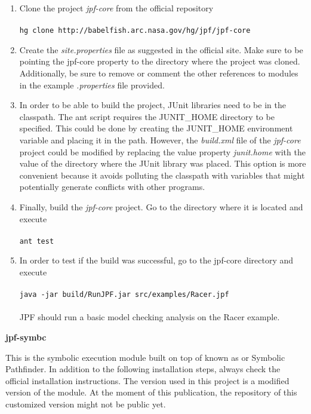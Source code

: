 \begin{enumerate}
	\item Clone the project \textit{jpf-core} from the official repository \\ \\
		\lstinline[]|hg clone http://babelfish.arc.nasa.gov/hg/jpf/jpf-core|
	\item Create the \textit{site.properties} file as suggested in the official \jpf{} site. Make sure to be pointing the jpf-core property to the directory where the project was cloned. Additionally, be sure to remove or comment the other references to modules in the example \textit{.properties} file provided.
	\item In order to be able to build the project, JUnit libraries need to be in the classpath. The ant script requires the JUNIT\_HOME directory to be specified. This could be done by creating the JUNIT\_HOME environment variable and placing it in the path. However, the \textit{build.xml} file of the \textit{jpf-core}  project could be modified by replacing the value property \textit{junit.home} with the value of the directory where the JUnit library was placed. This option is more convenient because it avoids polluting the classpath with variables that might potentially generate conflicts with other programs.
	\item Finally, build the \textit{jpf-core} project. Go to the directory where it is located and execute \\ \\
		\lstinline[]|ant test|
	\item In order to test if the build was successful, go to the jpf-core directory and execute \\ \\
		\lstinline[]|java -jar build/RunJPF.jar src/examples/Racer.jpf| \\ \\
	JPF should run a basic model checking analysis on the Racer example.	
\end{enumerate}

\textbf{jpf-symbc}

This is the symbolic execution module built on top of \jpf{} known as \spf{} or Symbolic Pathfinder. In addition to the following installation steps, always check the official installation instructions. The version used in this project is a modified version of the module. At the moment of this publication, the repository of this customized version might not be public yet.

